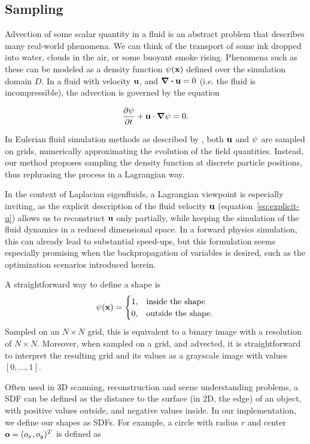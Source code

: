 \subsection{Sampling}\label{section:sampling}
Advection of some scalar quantity in a fluid is an abstract problem that
describes many real-world phenomena. We can think of the transport of some ink
dropped into water, clouds in the air, or some buoyant smoke rising. Phenomena
such as these can be modeled as a density function $\psi(\vb{x})$ defined over
the simulation domain $D$. In a fluid with velocity $\vb{u}$, and $\div{\vb{u}}
= 0$ (i.e. the fluid is incompressible), the advection is governed by the
equation

$$\pdv{\psi}{t} + \vb{u}\cdot \grad{\psi} = 0.$$

In Eulerian fluid simulation methods as described by \cite{StableFluids}, both
$\vb{u}$ and $\vb{\psi}$ are sampled on grids, numerically approximating the
evolution of the field quantities. Instead, our method proposes sampling the
density function at discrete particle positions, thus rephrasing the process in
a Lagrangian way.

In the context of Laplacian eigenfluids, a Lagrangian viewpoint is especially
inviting, as the explicit description of the fluid velocity $\vb{u}$
(equation~\eqref{eq:explicit-u}) allows us to reconstruct $\vb{u}$ only
partially, while keeping the simulation of the fluid dynamics in a reduced
dimensional space. In a forward physics simulation, this can already lead to
substantial speed-ups, but this formulation seems especially promising when the
backpropagation of variables is desired, such as the optimization scenarios
introduced herein.

A straightforward way to define a shape is
\begin{equation}\label{eq:binary-shape-function}
\psi(\vb{x}) = 
\begin{cases}
  1, & \qq*{inside the shape}\\
  0, & \text{outside the shape}.\\
\end{cases}
\end{equation}
Sampled on an $N \times N$ grid, this is equivalent to a binary image with
a resolution of $N \times N$. Moreover, when sampled on a grid, and advected,
it is straightforward to interpret the resulting grid and its values as
a grayscale image with values $[0,\dots,1]$.

Often used in 3D scanning, reconstruction and scene understanding problems,
a \acf{SDF} can be defined as the distance to the surface (in 2D, the edge) of
an object, with positive values outside, and negative values inside. In our
implementation, we define our shapes as \acp{SDF}. For example, a circle with
radius $r$ and center $\vb{o} = (o_x, o_y)^T$ is defined as

